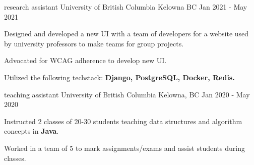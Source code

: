 \begin{cventries}


  \cventry
    {research assistant} %
    {University of British Columbia} %
    {Kelowna BC} %
    {Jan 2021 - May 2021} %
    {
      \begin{cvitems} %
        \item {Designed and developed a new UI with a team of developers for a website used by university professors to make teams for group projects.}     
        \item {Advocated for WCAG adherence to develop new UI.}     
        \item {Utilized the following techstack:  \textbf{Django, PostgreSQL, Docker, Redis.}}
      \end{cvitems}
    }


  \cventry
    {teaching assistant} %
    {University of British Columbia} %
    {Kelowna, BC} %
    {Jan 2020 - May 2020} %
    {
      \begin{cvitems} %
        \item {Instructed 2 classes of 20-30 students teaching data structures and algorithm concepts in \textbf{Java}.} 
        \item {Worked in a team of 5 to mark assignments/exams and assist students during classes.} 
      \end{cvitems}
    }


\end{cventries}
